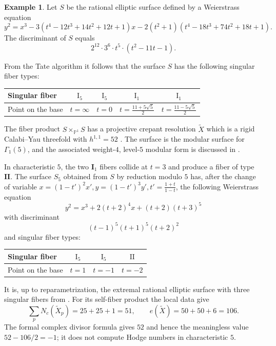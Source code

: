 \documentclass[a4paper]{amsart}
\theoremstyle{plain}
\theoremstyle{definition}
\newtheorem{Exm}[Thm]{Example}
\theoremstyle{remark}
\numberwithin{equation}{section}
\newcommand{\PP}{\mathbb{P}}
\begin{document}
\begin{Exm}\label{ex:62} Let $S$ be the rational elliptic surface defined by a Weierstrass equation
\[
y^{2}=x^{3}-3(t^4-12t^3+14t^2+12t+1)x-2(t^2+1)(t^4-18t^3+74t^2+18t+1).
\]
The discriminant of $S$ equals
\[
2^12\cdot 3^6\cdot t^5\cdot (t^2-11t-1).
\]

From the Tate algorithm it follows that the surface $S$ has the following singular fiber types:

\begin{table}[H]
	\centering
	\renewcommand{\arraystretch}{1.2}
	\begin{tabular}{lcccc}
		\toprule
		Singular fiber
		& $\mathrm{I}_{5}$
		& $\mathrm{I}_{5}$
		& $\mathrm{I}_{1}$
		& $\mathrm{I}_{1}$ \\
		\midrule
		Point on the base
		& $t=\infty$
		& $t=0$
		& $t=\frac{11+5\sqrt{5}}{2}$
		& $t=\frac{11-5\sqrt{5}}{2}$ \\
		\bottomrule
	\end{tabular}
\end{table}

The fiber product $S\times_{\PP^{1}}S$ has a projective crepant resolution
$\widetilde X$ which is a rigid Calabi--Yau threefold with
$h^{1,1}=52$ \cite{Schoen}.  The surface is the modular surface for
$\Gamma_1(5)$, and the associated weight-$4$, level-$5$ modular form is
discussed in \cite{NorikoUpdate}.

In characteristic $5$, the two $\mathbf{I}_1$ fibers collide at $t=3$ and
produce a fiber of type $\mathbf{II}$. The surface $S_{5}$
obtained from $S$ by reduction modulo $5$ has, after the change of variable $x=(1-t')^{2}x', y=(1-t')^{3}y', t'=\frac{1+t}{1-t}$,
the following Weierstrass equation
\[
y^{2}=x^{3}+2(t+2)^{4}x+(t+2)(t+3)^{5}
\]
with discriminant
\[
(t-1)^5(t+1)^5(t+2)^2
\]
and singular fiber
types:
\begin{table}[H]
	\centering
	\renewcommand{\arraystretch}{1.2}
	\begin{tabular}{lccc}
		\toprule
		Singular fiber
		& $\mathrm{I}_{5}$
		& $\mathrm{I}_{5}$
		& $\mathrm{II}$ \\
		\midrule
		Point on the base & $t=1$ & $t=-1$ & $t=-2$ \\
		\bottomrule
	\end{tabular}
\end{table}
It is, up to reparametrization, the extremal rational elliptic surface with
three singular fibers from \cite[Theorem~4.1]{LANG}.  For its self-fiber
product the local data give
\[
\sum_pN_c(\widetilde X_p)=25+25+1=51,
\qquad e(\widetilde X)=50+50+6=106.
\]
The formal complex divisor formula gives $52$ and hence the meaningless
value $52-106/2=-1$; it does not compute Hodge numbers in characteristic
$5$.
\end{Exm}
\end{document}
